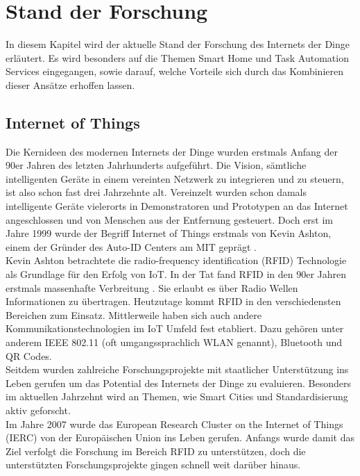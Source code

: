 \chapter{Stand der Forschung}
In diesem Kapitel wird der aktuelle Stand der Forschung des Internets der Dinge erläutert. Es wird besonders auf die Themen Smart Home und Task Automation Services eingegangen, sowie darauf, welche Vorteile sich durch das Kombinieren dieser Ansätze erhoffen lassen.


\section{Internet of Things}
Die Kernideen des modernen Internets der Dinge wurden erstmals Anfang der 90er Jahren des letzten Jahrhunderts aufgeführt. Die Vision, sämtliche intelligenten Geräte in einem vereinten Netzwerk zu integrieren und zu steuern, ist also schon fast drei Jahrzehnte alt. 
Vereinzelt wurden schon damals intelligente Geräte vielerorts in Demonstratoren und Prototypen an das Internet angeschlossen und von Menschen aus der Entfernung gesteuert. Doch erst im Jahre 1999 wurde der Begriff \glqq Internet of Things\grqq{} erstmals von Kevin Ashton, einem der Gründer des Auto-ID Centers am MIT geprägt \cite{iot_history}.\\

Kevin Ashton betrachtete die radio-frequency identification (RFID) Technologie als Grundlage für den Erfolg von IoT. In der Tat fand RFID in den 90er Jahren erstmals massenhafte Verbreitung \cite{rfid_history}. Sie erlaubt es über Radio Wellen Informationen zu übertragen. Heutzutage kommt RFID in den verschiedensten Bereichen zum Einsatz.
Mittlerweile haben sich auch andere Kommunikationstechnologien im IoT Umfeld fest etabliert. Dazu gehören unter anderem IEEE 802.11 (oft umgangssprachlich WLAN genannt), Bluetooth und QR Codes. \\

Seitdem wurden zahlreiche Forschungsprojekte mit staatlicher Unterstützung ins Leben gerufen um das Potential des Internets der Dinge zu evaluieren. Besonders im aktuellen Jahrzehnt wird an Themen, wie Smart Cities und Standardisierung aktiv geforscht.\\

Im Jahre 2007 wurde das European Research Cluster on the Internet of Things (IERC) \cite{ierc} von der Europäischen Union ins Leben gerufen. Anfangs wurde damit das Ziel verfolgt die Forschung im Bereich RFID zu unterstützen, doch die unterstützten Forschungsprojekte \cite{ierc:portfolios} gingen schnell weit darüber hinaus. \\

